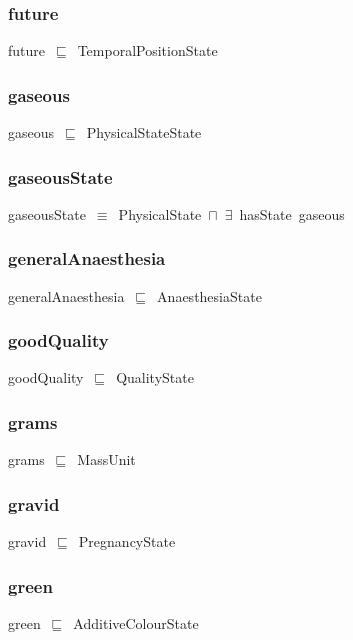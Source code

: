 \documentclass{article}
\begin{document}
\subsubsection*{future}

future~\ensuremath{\sqsubseteq}~TemporalPositionState~

\subsubsection*{gaseous}

gaseous~\ensuremath{\sqsubseteq}~PhysicalStateState~

\subsubsection*{gaseousState}

gaseousState~\ensuremath{\equiv}~PhysicalState~\ensuremath{\sqcap}~\ensuremath{\exists}~hasState~gaseous

\subsubsection*{generalAnaesthesia}

generalAnaesthesia~\ensuremath{\sqsubseteq}~AnaesthesiaState~

\subsubsection*{goodQuality}

goodQuality~\ensuremath{\sqsubseteq}~QualityState~

\subsubsection*{grams}

grams~\ensuremath{\sqsubseteq}~MassUnit~

\subsubsection*{gravid}

gravid~\ensuremath{\sqsubseteq}~PregnancyState~

\subsubsection*{green}

green~\ensuremath{\sqsubseteq}~AdditiveColourState~
\end{document}
